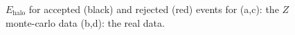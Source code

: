\documentclass[twoside,        %
               BCOR12mm,       %
               ngerman,english, %
               fleqn,headsepline=false,footsepline=false
              ]{Vorlage/MFPREPORT}
\begin{document}
\begin{appendices}
\begin{figure}
\begin{center}
{        }
    \end{center}
    \caption{
    $E_{\text{halo}}$ for accepted (black) and rejected (red) events
            for (a,c): the $Z$ monte-carlo data (b,d): the real data.}{
     }
  \label{fig:ehalo}


\end{figure}
\end{appendices}
\end{document}
